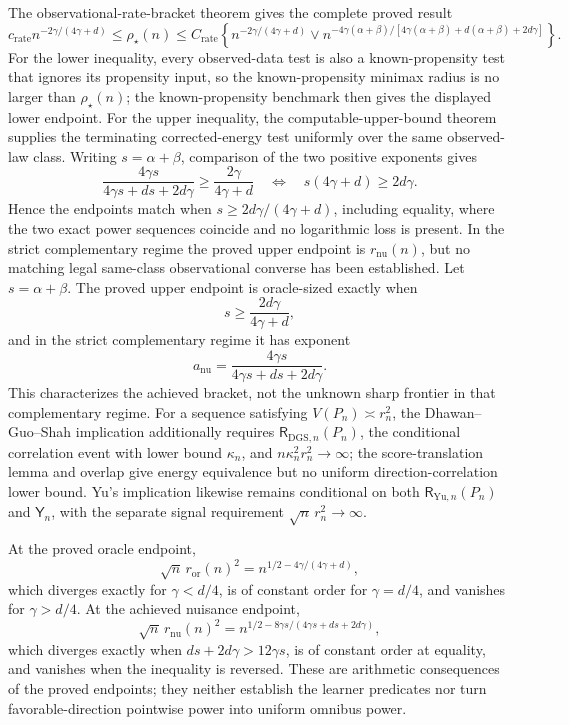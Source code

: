 The observational-rate-bracket theorem gives the complete proved result
\[
 c_{\mathrm{rate}}n^{-2\gamma/(4\gamma+d)}
 \le \rho_\star(n)
 \le C_{\mathrm{rate}}\left\{
 n^{-2\gamma/(4\gamma+d)}\vee
 n^{-4\gamma(\alpha+\beta)/[4\gamma(\alpha+\beta)+d(\alpha+\beta)+2d\gamma]}
 \right\}.
\]
For the lower inequality, every observed-data test is also a known-propensity test that ignores its propensity input, so the known-propensity minimax radius is no larger than \(\rho_\star(n)\); the known-propensity benchmark then gives the displayed lower endpoint.  For the upper inequality, the computable-upper-bound theorem supplies the terminating corrected-energy test uniformly over the same observed-law class.  Writing \(s=\alpha+\beta\), comparison of the two positive exponents gives
\[
 \frac{4\gamma s}{4\gamma s+ds+2d\gamma}
 \ge \frac{2\gamma}{4\gamma+d}
 \quad\Longleftrightarrow\quad
 s(4\gamma+d)\ge 2d\gamma.
\]
Hence the endpoints match when \(s\ge 2d\gamma/(4\gamma+d)\), including equality, where the two exact power sequences coincide and no logarithmic loss is present.  In the strict complementary regime the proved upper endpoint is \(r_{\mathrm{nu}}(n)\), but no matching legal same-class observational converse has been established.
Let \(s=\alpha+\beta\).  The proved upper endpoint is oracle-sized exactly when
\[
 s\ge \frac{2d\gamma}{4\gamma+d},
\]
and in the strict complementary regime it has exponent
\[
 a_{\mathrm{nu}}=
 \frac{4\gamma s}{4\gamma s+ds+2d\gamma}.
\]
This characterizes the achieved bracket, not the unknown sharp frontier in that complementary regime.  For a sequence satisfying \(V(P_n)\asymp r_n^2\), the Dhawan--Guo--Shah implication additionally requires \(\mathsf R_{\mathrm{DGS},n}(P_n)\), the conditional correlation event with lower bound \(\kappa_n\), and \(n\kappa_n^2r_n^2\to\infty\); the score-translation lemma and overlap give energy equivalence but no uniform direction-correlation lower bound.  Yu's implication likewise remains conditional on both \(\mathsf R_{\mathrm{Yu},n}(P_n)\) and \(\mathsf Y_n\), with the separate signal requirement \(\sqrt n\,r_n^2\to\infty\).

At the proved oracle endpoint,
\[
 \sqrt n\,r_{\mathrm{or}}(n)^2
 =n^{1/2-4\gamma/(4\gamma+d)},
\]
which diverges exactly for \(\gamma<d/4\), is of constant order for \(\gamma=d/4\), and vanishes for \(\gamma>d/4\).  At the achieved nuisance endpoint,
\[
 \sqrt n\,r_{\mathrm{nu}}(n)^2
 =n^{1/2-8\gamma s/(4\gamma s+ds+2d\gamma)},
\]
which diverges exactly when \(ds+2d\gamma>12\gamma s\), is of constant order at equality, and vanishes when the inequality is reversed.  These are arithmetic consequences of the proved endpoints; they neither establish the learner predicates nor turn favorable-direction pointwise power into uniform omnibus power.
